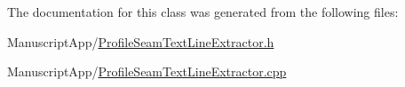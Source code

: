 The documentation for this class was generated from the following files\+:\begin{DoxyCompactItemize}
\item 
Manuscript\+App/\hyperlink{_profile_seam_text_line_extractor_8h}{Profile\+Seam\+Text\+Line\+Extractor.\+h}\item 
Manuscript\+App/\hyperlink{_profile_seam_text_line_extractor_8cpp}{Profile\+Seam\+Text\+Line\+Extractor.\+cpp}\end{DoxyCompactItemize}
